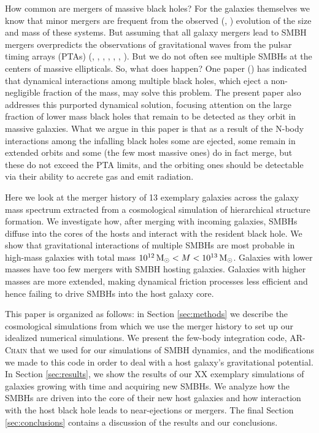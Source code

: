 \documentclass[english, apj]{emulateapj}
\newcommand{\msun}{\mbox{$\,{\rm M}_\odot$}}
\begin{document}
How common are mergers of massive black holes?  For the galaxies themselves we know that minor mergers are frequent from the observed (\citet{2010ApJ...718L..73V}, \citet{2008ApJ...677L...5V}) evolution of the size and mass of these systems.  But assuming that all galaxy mergers lead to SMBH mergers overpredicts the observations of gravitational waves from the pulsar timing arrays (PTAs) (\citet{2008MNRAS.390..192S}, \citet{2009MNRAS.394.2255S}, \citet{2013MNRAS.433L...1S}, \citet{2014ApJ...789..156M}, \citet{2015ApJ...799..178K}, \citet{2018ApJ...856...42S}, \citet{2018arXiv180403143I}).  But we do not often see multiple SMBHs at the centers of massive ellipticals.  So, what does happen?  One paper (\citet{2018MNRAS.473.3410R}) has indicated that dynamical interactions among multiple black holes, which eject a non-negligible fraction of the mass, may solve this problem.  The present paper also addresses this purported dynamical solution, focusing attention on the large fraction of lower mass black holes that remain to be detected as they orbit in massive galaxies.  What we argue in this paper is that as a result of the N-body interactions among the infalling black holes some are ejected, some remain in extended orbits and some (the few most massive ones) do in fact merge, but these do not exceed the PTA limits, and the orbiting ones should be detectable via their ability to accrete gas and emit radiation.

Here we look at the merger history of 13 exemplary galaxies across the galaxy mass spectrum extracted from a cosmological simulation of hierarchical structure formation. We investigate how, after merging with incoming galaxies, SMBHs diffuse into the cores of the hosts and interact with the resident black hole. We show that gravitational interactions of multiple SMBHs are most probable in high-mass galaxies with total mass $10^{12} \msun < M < 10^{13} \msun$. Galaxies with lower masses have too few mergers with SMBH hosting galaxies. Galaxies with higher masses are more extended, making dynamical friction processes less efficient and hence failing to drive SMBHs into the host galaxy core.

This paper is organized as follows: in Section \ref{sec:methods} we describe the cosmological simulations from which we use the merger history to set up our idealized numerical simulations. We present the few-body integration code, \textsc{AR-Chain} that we used for our simulations of SMBH dynamics, and the modifications we made to this code in order to deal with a host galaxy's gravitational potential. In Section \ref{sec:results}, we show the results of our XX exemplary simulations of galaxies growing with time and acquiring new SMBHs. We analyze how the SMBHs are driven into the core of their new host galaxies and how interaction with the host black hole leads to near-ejections or mergers. The final Section \ref{sec:conclusions} contains a discussion of the results and our conclusions.
\end{document}
